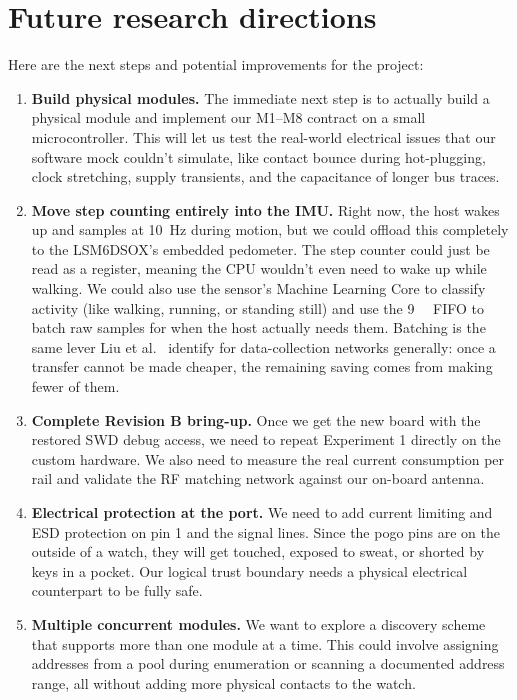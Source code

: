 \documentclass[12pt, a4paper]{article}
\begin{document}
\section{Future research directions}
\label{sec:future}

Here are the next steps and potential improvements for the project:

\begin{enumerate}
  \item \textbf{Build physical modules.} The immediate next step is to actually build a physical module and implement our M1--M8 contract on a small microcontroller. This will let us test the real-world electrical issues that our software mock couldn't simulate, like contact bounce during hot-plugging, clock stretching, supply transients, and the capacitance of longer bus traces.

  \item \textbf{Move step counting entirely into the IMU.} Right now, the host wakes up and samples at \SI{10}{\hertz} during motion, but we could offload this completely to the LSM6DSOX's embedded pedometer. The step counter could just be read as a register, meaning the CPU wouldn't even need to wake up while walking. We could also use the sensor's Machine Learning Core to classify activity (like walking, running, or standing still) and use the \SI{9}{\kibi\byte} FIFO to batch raw samples for when the host actually needs them. Batching is the same lever Liu et al.~\cite{liu2024} identify for data-collection networks generally: once a transfer cannot be made cheaper, the remaining saving comes from making fewer of them.

  \item \textbf{Complete Revision B bring-up.} Once we get the new board with the restored SWD debug access, we need to repeat Experiment 1 directly on the custom hardware. We also need to measure the real current consumption per rail and validate the RF matching network against our on-board antenna.

  \item \textbf{Electrical protection at the port.} We need to add current limiting and ESD protection on pin 1 and the signal lines. Since the pogo pins are on the outside of a watch, they will get touched, exposed to sweat, or shorted by keys in a pocket. Our logical trust boundary needs a physical electrical counterpart to be fully safe.

  \item \textbf{Multiple concurrent modules.} We want to explore a discovery scheme that supports more than one module at a time. This could involve assigning addresses from a pool during enumeration or scanning a documented address range, all without adding more physical contacts to the watch.


\end{enumerate}
\end{document}
